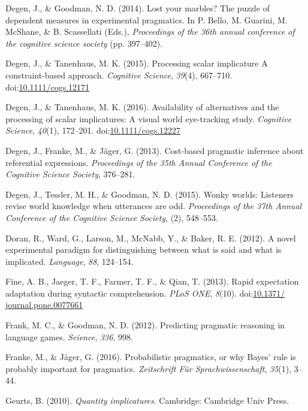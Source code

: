 \documentclass[man]{apa6}
\theoremstyle{definition}
\theoremstyle{definition}
\theoremstyle{definition}
\theoremstyle{remark}
\begin{document}
\hypertarget{ref-Degen2014}{}
Degen, J., \& Goodman, N. D. (2014). Lost your marbles? The puzzle of
dependent measures in experimental pragmatics. In P. Bello, M. Guarini,
M. McShane, \& B. Scassellati (Eds.), \emph{Proceedings of the 36th
annual conference of the cognitive science society} (pp. 397--402).

\hypertarget{ref-DegenTanenhaus2015}{}
Degen, J., \& Tanenhaus, M. K. (2015). Processing scalar implicature A
constraint-based approach. \emph{Cognitive Science}, \emph{39}(4),
667--710.
doi:\href{https://doi.org/10.1111/cogs.12171}{10.1111/cogs.12171}

\hypertarget{ref-DegenTanenhaus2016}{}
Degen, J., \& Tanenhaus, M. K. (2016). Availability of alternatives and
the processing of scalar implicatures: A visual world eye-tracking
study. \emph{Cognitive Science}, \emph{40}(1), 172--201.
doi:\href{https://doi.org/10.1111/cogs.12227}{10.1111/cogs.12227}

\hypertarget{ref-Degen2013}{}
Degen, J., Franke, M., \& Jäger, G. (2013). Cost-based pragmatic
inference about referential expressions. \emph{Proceedings of the 35th
Annual Conference of the Cognitive Science Society}, 376--281.

\hypertarget{ref-DegenTG2015}{}
Degen, J., Tessler, M. H., \& Goodman, N. D. (2015). Wonky worlds:
Listeners revise world knowledge when utterances are odd.
\emph{Proceedings of the 37th Annual Conference of the Cognitive Science
Society}, (2), 548--553.

\hypertarget{ref-Doran2012}{}
Doran, R., Ward, G., Larson, M., McNabb, Y., \& Baker, R. E. (2012). A
novel experimental paradigm for distinguishing between what is said and
what is implicated. \emph{Language}, \emph{88}, 124--154.

\hypertarget{ref-Fine2013}{}
Fine, A. B., Jaeger, T. F., Farmer, T. F., \& Qian, T. (2013). Rapid
expectation adaptation during syntactic comprehension. \emph{PLoS ONE},
\emph{8}(10).
doi:\href{https://doi.org/10.1371/\%20journal.pone.0077661}{10.1371/ journal.pone.0077661}

\hypertarget{ref-Frank2012}{}
Frank, M. C., \& Goodman, N. D. (2012). Predicting pragmatic reasoning
in language games. \emph{Science}, \emph{336}, 998.

\hypertarget{ref-Franke2016}{}
Franke, M., \& Jäger, G. (2016). Probabilistic pragmatics, or why Bayes'
rule is probably important for pragmatics. \emph{Zeitschrift Für
Sprachwissenschaft}, \emph{35}(1), 3--44.

\hypertarget{ref-Geurts2010}{}
Geurts, B. (2010). \emph{Quantity implicatures}. Cambridge: Cambridge
Univ Press.
\end{document}
